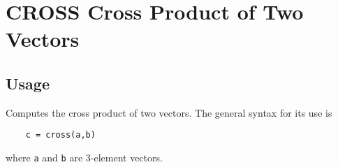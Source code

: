 \section{CROSS Cross Product of Two Vectors}

\subsection{Usage}

Computes the cross product of two vectors.  The general syntax
for its use is
\begin{verbatim}
    c = cross(a,b)
\end{verbatim}
where \verb|a| and \verb|b| are 3-element vectors.
